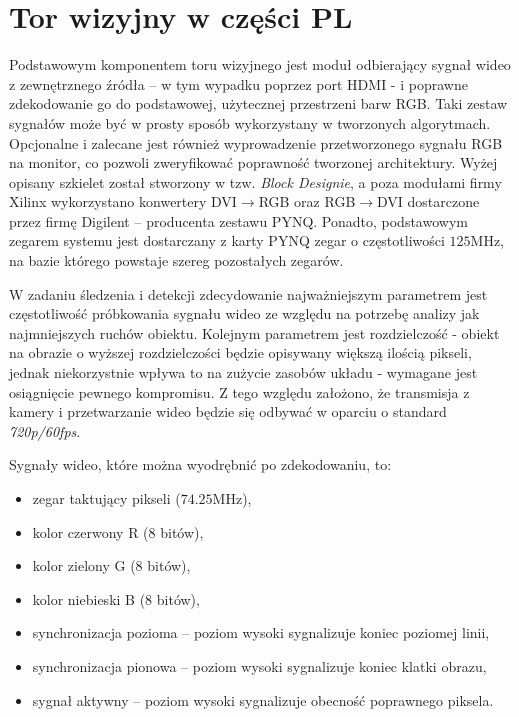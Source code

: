 \section{Tor wizyjny w części PL} %
\label{sec:counter}


Podstawowym komponentem toru wizyjnego jest moduł odbierający sygnał wideo z zewnętrznego źródła -- w tym wypadku poprzez port HDMI - i poprawne zdekodowanie go do podstawowej, użytecznej przestrzeni barw RGB. 
Taki zestaw sygnałów może być w prosty sposób wykorzystany w tworzonych algorytmach. %
Opcjonalne i zalecane jest również wyprowadzenie przetworzonego sygnału RGB na monitor, co pozwoli zweryfikować poprawność tworzonej architektury. 
Wyżej opisany szkielet został stworzony w tzw. \textit{Block Designie}, a poza modułami firmy Xilinx wykorzystano konwertery DVI$\rightarrow$RGB oraz RGB$\rightarrow$DVI dostarczone przez firmę Digilent -- producenta zestawu PYNQ. 
Ponadto, podstawowym zegarem systemu jest dostarczany z karty PYNQ zegar o częstotliwości $125$MHz, na bazie którego powstaje szereg pozostałych zegarów. %
 
W zadaniu śledzenia i detekcji zdecydowanie najważniejszym parametrem jest częstotliwość próbkowania sygnału wideo ze względu na potrzebę analizy jak najmniejszych ruchów obiektu. Kolejnym parametrem jest rozdzielczość - obiekt na obrazie o wyższej rozdzielczości będzie opisywany większą ilością pikseli, jednak niekorzystnie wpływa to na zużycie zasobów układu - wymagane jest osiągnięcie pewnego kompromisu. Z tego względu założono, że transmisja z kamery i przetwarzanie wideo będzie się odbywać w oparciu o standard \textit{720p/60fps}.%

Sygnały wideo, które można wyodrębnić po zdekodowaniu, to:
\begin{itemize}
	\item zegar taktujący pikseli ($74.25$MHz),
	\item kolor czerwony R (8 bitów),
	\item kolor zielony G (8 bitów),
	\item kolor niebieski B (8 bitów),
	\item synchronizacja pozioma -- poziom wysoki sygnalizuje koniec poziomej linii,
	\item synchronizacja pionowa -- poziom wysoki sygnalizuje koniec klatki obrazu,
	\item sygnał aktywny -- poziom wysoki sygnalizuje obecność poprawnego piksela.
\end{itemize}

